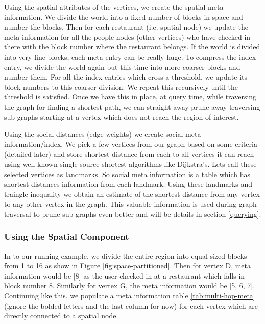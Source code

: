 Using the spatial attributes of the vertices, we create the spatial meta information. We divide the world into a fixed number of blocks in space and number the blocks. Then for each restaurant (i.e. spatial node) we update the meta information for all the people nodes (other vertices) who have checked-in there with the block number where the restaurant belongs. If the world is divided into very fine blocks, each meta entry can be really huge. To compress the index entry, we divide the world again but this time into more coarser blocks and number them. For all the index entries which cross a threshold, we update its block numbers to this coarser division. We repeat this recursively until the threshold is satisfied. Once we have this in place, at query time, while traversing the graph for finding a shortest path, we can straight away prune away traversing sub-graphs starting at a vertex which does not reach the region of interest.

Using the social distances (edge weights) we create social meta information/index. We pick a few vertices from our graph based on some criteria (detailed later) and store shortest distance from each to all vertices it can reach using well known single source shortest algorithms like Dijkstra's. Lets call these selected vertices as landmarks. So social meta information is a table which has shortest distances information from each landmark. Using these landmarks and traingle inequality we obtain an estimate of the shortest distance from any vertex to any other vertex in the graph. This valuable information is used during graph traversal to prune sub-graphs even better and will be details in section \ref{querying}.

\subsubsection{Using the Spatial Component}
In to our running example, we divide the entire region into equal sized blocks from 1 to 16 as show in Figure \ref{fig:space-partitioned}. Then for vertex D, meta information would be {[}8{]} as the user checked-in at a restaurant which falls in block number 8. Similarly for vertex G, the meta information would be {[}5, 6, 7{]}. Continuing like this, we populate a meta information table \ref{tab:multi-hop-meta} (ignore the bolded letters and the last column for now) for each vertex which are directly connected to a spatial node.

